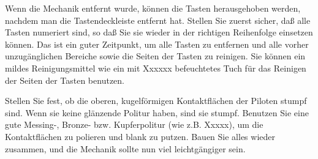 Wenn die Mechanik entfernt wurde, können die Tasten herausgehoben werden, nachdem man die Tastendeckleiste entfernt hat.
 Stellen Sie zuerst sicher, daß alle Tasten numeriert sind, so daß Sie sie wieder in der richtigen Reihenfolge einsetzen können.
 Das ist ein guter Zeitpunkt, um alle Tasten zu entfernen und alle vorher unzugänglichen Bereiche sowie die Seiten der Tasten zu reinigen.
 Sie können ein mildes Reinigungsmittel wie ein mit Xxxxxx befeuchtetes Tuch für das Reinigen der Seiten der Tasten benutzen.
 

Stellen Sie fest, ob die oberen, kugelförmigen Kontaktflächen der Piloten stumpf sind.
 Wenn sie keine glänzende Politur haben, sind sie stumpf.
 Benutzen Sie eine gute Messing-, Bronze- bzw. Kupferpolitur (wie z.B. Xxxxx), um die Kontaktflächen zu polieren und blank zu putzen.
 Bauen Sie alles wieder zusammen, und die Mechanik sollte nun viel leichtgängiger sein.
 